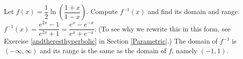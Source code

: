 {\label{inversehyptangent} Let $f(x) = \dfrac{1}{2}\ln\left(\dfrac{1 + x}{1 - x}\right)$.  Compute $f^{-1}(x)$ and find its domain and range.}
{$f^{-1}(x) = \dfrac{e^{2x} - 1}{e^{2x} + 1} = \dfrac{e^{x} - e^{-x}}{e^{x} + e^{-x}}$. (To see why we rewrite this in this form, see  Exercise \ref{andtheresthyperbolic} in Section \ref{Parametric}.)  The domain of $f^{-1}$ is $(-\infty, \infty)$ and its range is the same as the domain of $f$, namely $(-1, 1)$.}